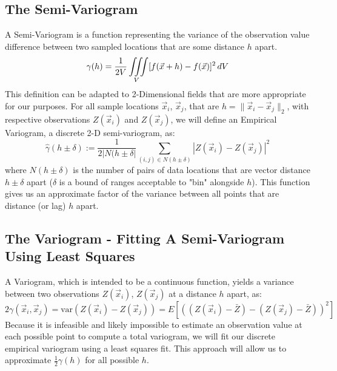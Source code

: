 \documentclass[11pt]{ucthesis}
\begin{document}
\subsection{The Semi-Variogram}
A Semi-Variogram is a function representing the variance of the observation value difference between two sampled locations that are some distance $h$ apart. 
\begin{equation}
	\gamma(h)=\frac{1}{2V}\iiint\limits_V [f(\vec{x}+h)-f(\vec{x})]^2 \,dV \\
\end{equation}
\cite{matheron:geostat}
This definition can be adapted to 2-Dimensional fields that are more appropriate for our purposes. For all sample locations $\vec{x}_{i}$, $\vec{x}_{j}$, that are $h=\|\vec{x}_{i} - \vec{x}_{j} \|_{2}$, with respective observations $Z(\vec{x}_{i})$ and $Z(\vec{x}_{j})$, we will define an Empirical Variogram, a discrete 2-D semi-variogram, as:
\begin{equation}
	\hat{\gamma}(h\pm\delta) := \frac{1}{2|N(h\pm\delta|}\sum\limits_{(i,j)\in N(h\pm\delta)}|Z(\vec{x}_i) - Z(\vec{x}_j)|^2 %
\end{equation}
\cite{cressie:spatial}
where $N(h\pm\delta)$ is the number of pairs of data locations that are vector distance $h\pm\delta$ apart ($\delta$ is a bound of ranges acceptable to "bin" alongside $h$).
This function gives us an approximate factor of the variance between all points that are distance (or lag) $h$ apart.

\subsection{The Variogram - Fitting A Semi-Variogram Using Least Squares}
A Variogram, which is intended to be a continuous function, yields a variance between two observations $Z(\vec{x}_{i})$, $Z(\vec{x}_{j})$ at a distance $h$ apart, as:
\begin{equation}
	2\gamma(\vec{x}_i, \vec{x}_j)= \text{var} (Z(\vec{x}_{i}) - Z(\vec{x}_{j}))=E[( (Z(\vec{x}_{i}) - \bar{Z} ) - (Z(\vec{x}_{j}) - \bar{Z} ))^2]
\end{equation}
\cite{cressie:spatial}
Because it is infeasible and likely impossible to estimate an observation value at each possible point to compute a total variogram, we will fit our discrete empirical variogram using a least squares fit. This approach will allow us to approximate $\frac{1}{2}\gamma(h)$ for all possible $h$.
\end{document}
